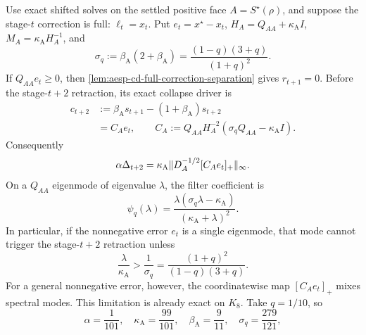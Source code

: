 \begin{proposition}
\label{prop:aesp-cd-post-full-high-pass}
Use exact shifted solves on the settled positive face
$A=S^\star(\rho)$, and suppose the stage-$t$ correction is full:
$\ell_t=x_t$.  Put $e_t=x^\star-x_t$, $H_A=Q_{AA}+\kappa_{\mathrm A}I$,
$M_A=\kappa_{\mathrm A}H_A^{-1}$, and
\begin{equation}
 \sigma_q:=\beta_{\mathrm A}(2+\beta_{\mathrm A})
 =\frac{(1-q)(3+q)}{(1+q)^2}.
 \label{eq:aesp-cd-post-full-sigma}
\end{equation}
If $Q_{AA}e_t\geq0$, then
\cref{lem:aesp-cd-full-correction-separation} gives $r_{t+1}=0$.  Before
the stage-$t+2$ retraction, its exact collapse driver is
\begin{equation}
 \begin{split}
 c_{t+2}
 &:=\beta_{\mathrm A}s_{t+1}
       -(1+\beta_{\mathrm A})s_{t+2}\\
 &=C_Ae_t,
 \qquad
 C_A:=Q_{AA}H_A^{-2}
          (\sigma_qQ_{AA}-\kappa_{\mathrm A}I).
 \end{split}
 \label{eq:aesp-cd-post-full-filter}
\end{equation}
Consequently
\begin{equation}
 \alpha\Delta_{t+2}
 =\kappa_{\mathrm A}
 \lVert D_A^{-1/2}[C_Ae_t]_+\rVert_\infty.
 \label{eq:aesp-cd-post-full-filter-retraction}
\end{equation}
On a $Q_{AA}$ eigenmode of eigenvalue $\lambda$, the filter coefficient is
\begin{equation}
 \psi_q(\lambda)
 =\frac{\lambda(\sigma_q\lambda-\kappa_{\mathrm A})}
        {(\kappa_{\mathrm A}+\lambda)^2}.
 \label{eq:aesp-cd-post-full-filter-eigenvalue}
\end{equation}
In particular, if the nonnegative error $e_t$ is a single eigenmode, that
mode cannot trigger the stage-$t+2$ retraction unless
\begin{equation}
 \frac\lambda{\kappa_{\mathrm A}}
 >\frac1{\sigma_q}
 =\frac{(1+q)^2}{(1-q)(3+q)}.
 \label{eq:aesp-cd-post-full-high-threshold}
\end{equation}
For a general nonnegative error, however, the coordinatewise map
$[C_Ae_t]_+$ mixes spectral modes.  This limitation is already exact on
$K_8$.  Take $q=1/10$, so
\begin{equation*}
 \alpha=\frac1{101},\quad
 \kappa_{\mathrm A}=\frac{99}{101},\quad
 \beta_{\mathrm A}=\frac9{11},\quad
 \sigma_q=\frac{279}{121},
\end{equation*}

\end{proposition}
